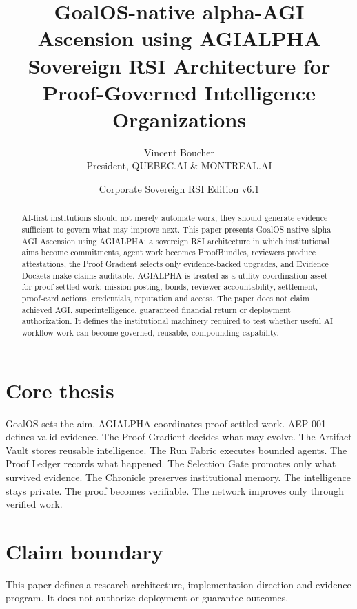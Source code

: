 \documentclass[11pt]{article}
\title{GoalOS-native alpha-AGI Ascension using AGIALPHA\\\large Sovereign RSI Architecture for Proof-Governed Intelligence Organizations}
\author{Vincent Boucher\\President, QUEBEC.AI \& MONTREAL.AI}
\date{Corporate Sovereign RSI Edition v6.1}
\begin{document}
\maketitle
\begin{abstract}
AI-first institutions should not merely automate work; they should generate evidence sufficient to govern what may improve next. This paper presents GoalOS-native alpha-AGI Ascension using AGIALPHA: a sovereign RSI architecture in which institutional aims become commitments, agent work becomes ProofBundles, reviewers produce attestations, the Proof Gradient selects only evidence-backed upgrades, and Evidence Dockets make claims auditable. AGIALPHA is treated as a utility coordination asset for proof-settled work: mission posting, bonds, reviewer accountability, settlement, proof-card actions, credentials, reputation and access. The paper does not claim achieved AGI, superintelligence, guaranteed financial return or deployment authorization. It defines the institutional machinery required to test whether useful AI workflow work can become governed, reusable, compounding capability.
\end{abstract}
\section*{Core thesis}
GoalOS sets the aim. AGIALPHA coordinates proof-settled work. AEP-001 defines valid evidence. The Proof Gradient decides what may evolve. The Artifact Vault stores reusable intelligence. The Run Fabric executes bounded agents. The Proof Ledger records what happened. The Selection Gate promotes only what survived evidence. The Chronicle preserves institutional memory. The intelligence stays private. The proof becomes verifiable. The network improves only through verified work.
\section*{Claim boundary}
This paper defines a research architecture, implementation direction and evidence program. It does not authorize deployment or guarantee outcomes.
\end{document}
